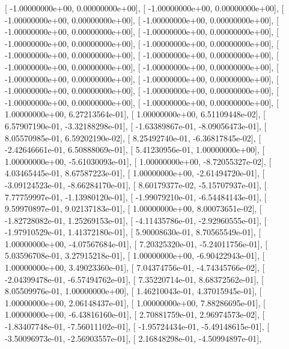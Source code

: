 \documentclass{article}
\begin{document}
       [ -1.00000000e+00,   0.00000000e+00],
       [ -1.00000000e+00,   0.00000000e+00],
       [ -1.00000000e+00,   0.00000000e+00],
       [ -1.00000000e+00,   0.00000000e+00],
       [ -1.00000000e+00,   0.00000000e+00],
       [ -1.00000000e+00,   0.00000000e+00],
       [ -1.00000000e+00,   0.00000000e+00],
       [ -1.00000000e+00,   0.00000000e+00],
       [ -1.00000000e+00,   0.00000000e+00],
       [ -1.00000000e+00,   0.00000000e+00],
       [ -1.00000000e+00,   0.00000000e+00],
       [ -1.00000000e+00,   0.00000000e+00],
       [ -1.00000000e+00,   0.00000000e+00],
       [ -1.00000000e+00,   0.00000000e+00],
       [ -1.00000000e+00,   0.00000000e+00],
       [ -1.00000000e+00,   0.00000000e+00],
       [ -1.00000000e+00,   0.00000000e+00],
       [ -1.00000000e+00,   0.00000000e+00],
       [  1.00000000e+00,   6.27213564e-01],
       [  1.00000000e+00,   6.51109448e-02],
       [  6.57907190e-01,  -3.32188298e-01],
       [ -1.63389867e-01,  -8.09056473e-01],
       [  8.05570985e-01,   6.59202190e-02],
       [  8.25492740e-01,  -6.36817845e-02],
       [ -2.42646661e-01,   6.50888069e-01],
       [  5.41230956e-01,   1.00000000e+00],
       [  1.00000000e+00,  -5.61030093e-01],
       [  1.00000000e+00,  -8.72055327e-02],
       [  4.03465445e-01,   8.67587223e-01],
       [  1.00000000e+00,  -2.61494720e-01],
       [ -3.09124523e-01,  -8.66284170e-01],
       [  8.60179377e-02,  -5.15707937e-01],
       [  7.77759997e-01,  -1.13980120e-01],
       [ -1.99079210e-01,  -6.54484143e-01],
       [  9.59970897e-01,   9.02137183e-01],
       [  1.00000000e+00,   8.00073651e-02],
       [ -1.82728082e-01,   1.25269153e-01],
       [ -4.11435786e-01,  -2.92960555e-01],
       [ -1.97910529e-01,   1.41372180e-01],
       [  5.90008630e-01,   8.70565549e-01],
       [  1.00000000e+00,  -4.07567684e-01],
       [  7.20325320e-01,  -5.24011756e-01],
       [  5.03596708e-01,   3.27915218e-01],
       [  1.00000000e+00,  -6.90422943e-01],
       [  1.00000000e+00,   3.49023360e-01],
       [  7.04374756e-01,  -4.74345766e-02],
       [ -2.04399478e-01,  -6.57494762e-01],
       [  7.35220714e-01,   8.68372562e-01],
       [  8.05509976e-01,   1.00000000e+00],
       [  1.46210043e-01,   4.37015945e-01],
       [  1.00000000e+00,   2.06148437e-01],
       [  1.00000000e+00,   7.88286695e-01],
       [  1.00000000e+00,  -6.43816160e-01],
       [  2.70881759e-01,   2.96974573e-02],
       [ -1.83407748e-01,  -7.56011102e-01],
       [ -1.95724434e-01,  -5.49148615e-01],
       [ -3.50096973e-01,  -2.56903557e-01],
       [  2.16848298e-01,  -4.50994897e-01],
\end{document}
